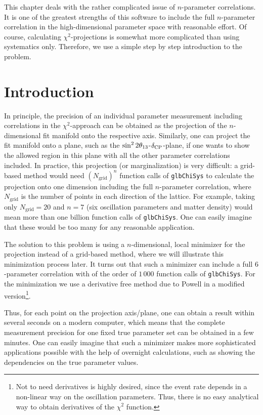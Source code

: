 This chapter deals with the rather complicated issue of $n$-parameter correlations. It is one of the greatest strengths of this software 
to include the full $n$-parameter correlation in the high-dimensional parameter space with reasonable effort. Of course, calculating $\chi^2$-projections is somewhat more complicated than using systematics only. Therefore, we use a simple step by step introduction to the problem. 



\section{Introduction}

In principle, the precision of an individual parameter measurement including
 correlations in the $\chi^2$-approach can be obtained as the projection of 
the $n$-dimensional fit manifold onto the respective axis. Similarly, one can 
project the fit manifold onto a plane, such as the $\sin^2 2 \theta_{13}$-$\delta_{\mathrm{CP}}$-plane,
 if one wants to show the allowed
region in this plane with all the other parameter correlations included. 
In practice, this projection (or marginalization) is very difficult: a grid-based method would 
need $(N_{\mathrm{grid}})^n$ function calls of {\tt glbChiSys} to 
calculate the projection onto one dimension 
including the full $n$-parameter correlation, where 
$N_{\mathrm{grid}}$ is the number of points in each direction of the 
lattice. For example, taking only $N_{\mathrm{grid}}=20$ and 
$n=7$ (six oscillation parameters and matter density) would mean more 
than one billion function calls of {\tt glbChiSys}. One can easily imagine 
that these would be too many for any reasonable application.

The solution to this problem is using a $n$-dimensional, local 
minimizer for the projection instead of a grid-based method, where we will
illustrate this minimization process later. It turns out
that such a minimizer can include a full $6$-parameter correlation 
with of the order of $1\, 000$ function calls of {\tt glbChiSys}. For the 
minimization we use a derivative free method due to Powell in a 
modified~\cite{Brent:1973} version\footnote{Not to need derivatives is
highly desired, since the event rate depends in a non-linear way on the
oscillation parameters. Thus, there is no easy analytical way
to obtain derivatives of the $\chi^2$ function.}.

Thus, for each point on the projection axis/plane, one can obtain a result within several seconds on a modern computer, which means that the complete measurement precision for one fixed true parameter set can be obtained in a few minutes. One can easily imagine that such a minimizer makes more sophisticated applications possible with the help of overnight calculations, such as showing the dependencies on the true parameter values.

